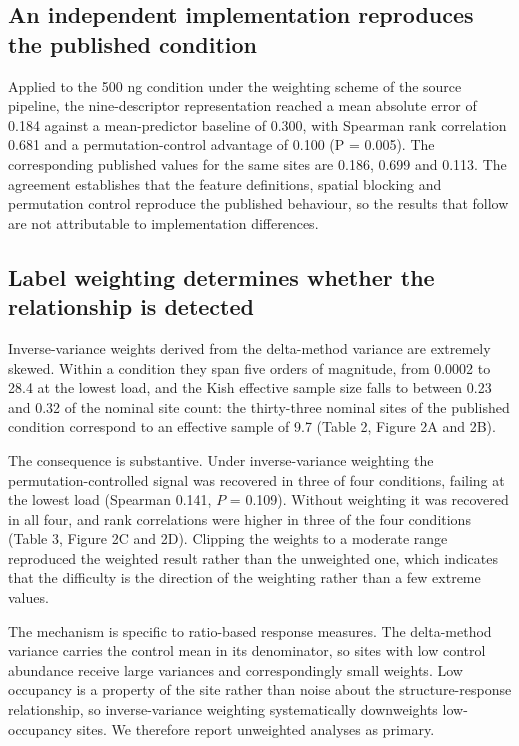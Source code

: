 \documentclass[journal=jprobs,manuscript=article,layout=traditional]{achemso}
\begin{document}
\subsection{An independent implementation reproduces the published condition}

Applied to the 500 ng condition under the weighting scheme of the source pipeline, the nine-descriptor representation reached a mean absolute error of 0.184 against a mean-predictor baseline of 0.300, with Spearman rank correlation 0.681 and a permutation-control advantage of 0.100 (P = 0.005). The corresponding published values for the same sites are 0.186, 0.699 and 0.113. The agreement establishes that the feature definitions, spatial blocking and permutation control reproduce the published behaviour, so the results that follow are not attributable to implementation differences.

\subsection{Label weighting determines whether the relationship is detected}

Inverse-variance weights derived from the delta-method variance are extremely skewed. Within a condition they span five orders of magnitude, from 0.0002 to 28.4 at the lowest load, and the Kish effective sample size falls to between 0.23 and 0.32 of the nominal site count: the thirty-three nominal sites of the published condition correspond to an effective sample of 9.7 (Table 2, Figure 2A and 2B).

The consequence is substantive. Under inverse-variance weighting the permutation-controlled signal was recovered in three of four conditions, failing at the lowest load (Spearman 0.141, $P$ = 0.109). Without weighting it was recovered in all four, and rank correlations were higher in three of the four conditions (Table 3, Figure 2C and 2D). Clipping the weights to a moderate range reproduced the weighted result rather than the unweighted one, which indicates that the difficulty is the direction of the weighting rather than a few extreme values.

The mechanism is specific to ratio-based response measures. The delta-method variance carries the control mean in its denominator, so sites with low control abundance receive large variances and correspondingly small weights. Low occupancy is a property of the site rather than noise about the structure-response relationship, so inverse-variance weighting systematically downweights low-occupancy sites. We therefore report unweighted analyses as primary.
\end{document}
